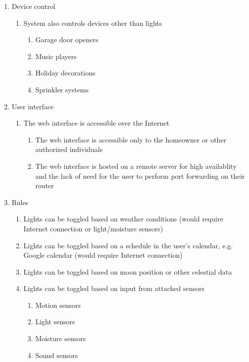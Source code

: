 \documentclass[12pt]{article}
\begin{document}
\begin{enumerate}[resume]
    \item Device control
        \begin{enumerate}
            \item System also controls devices other than lights
                \begin{enumerate}
                    \item Garage door openers
                    \item Music players
                    \item Holiday decorations
                    \item Sprinkler systems
                \end{enumerate}
        \end{enumerate}
    \item User interface
        \begin{enumerate}
            \item The web interface is accessible over the Internet
                \begin{enumerate}
                    \item The web interface is accessible only to the homeowner or other authorized individuals
                    \item The web interface is hosted on a remote server for high availablity and the lack of need for the user to perform port forwarding on their router
                \end{enumerate}
        \end{enumerate}
    \item Rules
        \begin{enumerate}
            \item Lights can be toggled based on weather conditions (would require Internet connection or light/moisture sensors)
            \item Lights can be toggled based on a schedule in the user's calendar, e.g. Google calendar (would require Internet connection)
            \item Lights can be toggled based on moon position or other celestial data
            \item Lights can be toggled based on input from attached sensors
                \begin{enumerate}
                    \item Motion sensors
                    \item Light sensors
                    \item Moisture sensors
                    \item Sound sensors
                \end{enumerate}
        \end{enumerate}
\end{enumerate}
\end{document}

